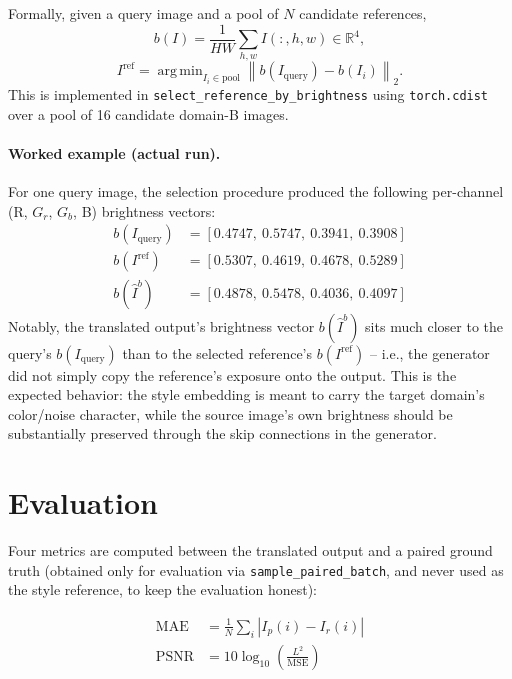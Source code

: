 \documentclass[11pt]{article}
\DeclareMathOperator*{\argmin}{arg\,min}
\begin{document}
Formally, given a query image and a pool of $N$ candidate references,
\begin{equation}
    b(I) = \frac{1}{HW}\sum_{h,w} I(:,h,w) \in \mathbb{R}^4,
\end{equation}
\begin{equation}
    I^{\text{ref}} = \argmin_{I_i \in \text{pool}}
        \left\lVert b(I_{\text{query}}) - b(I_i) \right\rVert_2 .
\end{equation}
This is implemented in \texttt{select\_reference\_by\_brightness} using
\texttt{torch.cdist} over a pool of 16 candidate domain-B images.

\paragraph{Worked example (actual run).} For one query image, the
selection procedure produced the following per-channel (R, $G_r$,
$G_b$, B) brightness vectors:
\begin{align*}
    b(I_{\text{query}}) &= [0.4747,\ 0.5747,\ 0.3941,\ 0.3908] \\
    b(I^{\text{ref}})   &= [0.5307,\ 0.4619,\ 0.4678,\ 0.5289] \\
    b(\hat{I}^{b})       &= [0.4878,\ 0.5478,\ 0.4036,\ 0.4097]
\end{align*}
Notably, the translated output's brightness vector $b(\hat{I}^b)$ sits
much closer to the query's $b(I_{\text{query}})$ than to the selected
reference's $b(I^{\text{ref}})$ -- i.e., the generator did not simply
copy the reference's exposure onto the output. This is the expected
behavior: the style embedding is meant to carry the target domain's
color/noise character, while the source image's own brightness should
be substantially preserved through the skip connections in the
generator.

\section{Evaluation}

Four metrics are computed between the translated output and a paired
ground truth (obtained only for evaluation via
\texttt{sample\_paired\_batch}, and never used as the style reference,
to keep the evaluation honest):

\begin{align}
    \text{MAE} &= \frac{1}{N}\sum_i |I_p(i) - I_r(i)| \\
    \text{PSNR} &= 10 \log_{10}\!\left(\frac{L^2}{\text{MSE}}\right) \\
\end{align}
\end{document}
